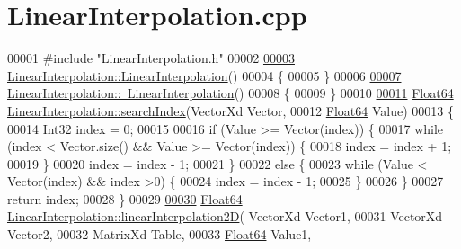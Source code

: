 \hypertarget{_linear_interpolation_8cpp_source}{}\section{Linear\+Interpolation.\+cpp}
\label{_linear_interpolation_8cpp_source}

\begin{DoxyCode}
00001 \textcolor{preprocessor}{#include "LinearInterpolation.h"}
00002 
\hyperlink{class_linear_interpolation_aaae2ec77e7767bb5fc7ca34a6e1197f1}{00003} \hyperlink{class_linear_interpolation_aaae2ec77e7767bb5fc7ca34a6e1197f1}{LinearInterpolation::LinearInterpolation}()
00004 \{
00005 \}
00006 
\hyperlink{class_linear_interpolation_a36a34fa39c430e05bdc073c1ac9ad4df}{00007} \hyperlink{class_linear_interpolation_a36a34fa39c430e05bdc073c1ac9ad4df}{LinearInterpolation::~LinearInterpolation}()
00008 \{
00009 \}
00010 
\hyperlink{class_linear_interpolation_a0be6504a98fabcd63d81d30a2d2d9add}{00011} \hyperlink{group___tools_ga3f1431cb9f76da10f59246d1d743dc2c}{Float64} \hyperlink{class_linear_interpolation_a0be6504a98fabcd63d81d30a2d2d9add}{LinearInterpolation::searchIndex}(VectorXd Vector,
00012                                          \hyperlink{group___tools_ga3f1431cb9f76da10f59246d1d743dc2c}{Float64} Value)
00013 \{
00014     Int32 index = 0;
00015 
00016     \textcolor{keywordflow}{if} (Value >= Vector(index)) \{
00017         \textcolor{keywordflow}{while} (index < Vector.size() && Value >= Vector(index)) \{
00018             index = index + 1;
00019         \}
00020         index = index - 1;
00021     \}
00022     \textcolor{keywordflow}{else} \{
00023         \textcolor{keywordflow}{while} (Value < Vector(index) && index >0) \{
00024             index = index - 1;
00025         \}
00026     \}
00027     \textcolor{keywordflow}{return} index;
00028 \}
00029 
\hyperlink{class_linear_interpolation_a6b143368c20db0d2cda905a86391f83f}{00030} \hyperlink{group___tools_ga3f1431cb9f76da10f59246d1d743dc2c}{Float64} \hyperlink{class_linear_interpolation_a6b143368c20db0d2cda905a86391f83f}{LinearInterpolation::linearInterpolation2D}(
      VectorXd Vector1,
00031                                                    VectorXd Vector2,
00032                                                    MatrixXd Table,
00033                                                    \hyperlink{group___tools_ga3f1431cb9f76da10f59246d1d743dc2c}{Float64} Value1,

\end{DoxyCode}

